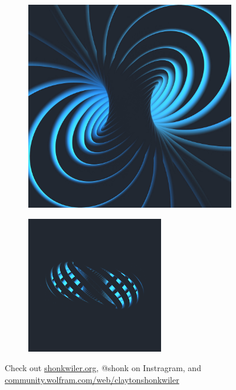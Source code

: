 \documentclass[aspectratio=169]{beamer}
\begin{document}
    \begin{frame}{}
\vfill
\begin{figure}[H]
     \centering
     \begin{subfigure}[b]{0.45\textwidth}
         \centering
    	\includegraphics[width=\textwidth]{33700724514_35273ae7ca_b.jpg}
     \end{subfigure}
     \hfill
     \begin{subfigure}[b]{0.45\textwidth}
         \centering
         \includegraphics[width=\textwidth]{download.png}
     \end{subfigure}
\caption{Check out \url{shonkwiler.org}, @shonk on Instragram, and \url{community.wolfram.com/web/claytonshonkwiler}}
\end{figure}
\vfill
    \end{frame}
\end{document}

